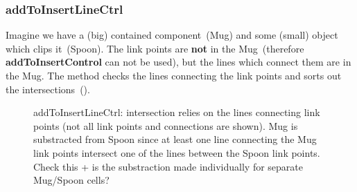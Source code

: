 \subsubsection{addToInsertLineCtrl}

Imagine we have a (big) contained component~(Mug) and some (small)
object which clips it~(Spoon). The link points are {\bf not} in the
Mug~(therefore {\bf addToInsertControl} can not be used), but the
lines which connect them are in the Mug.  The method checks the lines
connecting the link points and sorts out the intersections~().

\begin{figure}
  \centering
  \caption{addToInsertLineCtrl: intersection relies on the lines connecting link points (not all link points and connections are shown). Mug is substracted from Spoon since at least one line connecting the Mug link points intersect one of the lines between the Spoon link points. \alert{Check this + is the substraction made individually for separate Mug/Spoon cells?}}
  \label{fig:linectrl}
\end{figure}
